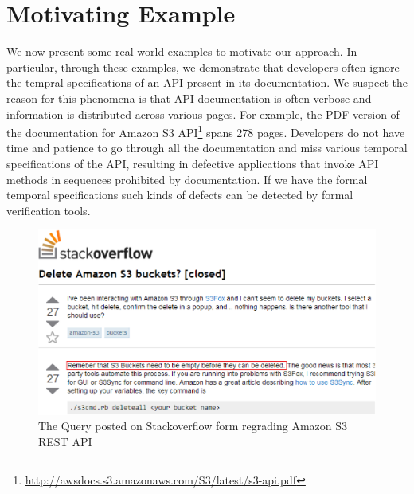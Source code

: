 \section{Motivating Example}
\label{sec:example}

We now present some real world examples to motivate our approach. In particular, through these examples, we demonstrate that developers often ignore the tempral specifications of an API present in its documentation. We suspect the reason for this phenomena is that API documentation is often verbose and information is distributed across various
pages. For example, the PDF version of the documentation for Amazon S3 API\footnote{\url{http://awsdocs.s3.amazonaws.com/S3/latest/s3-api.pdf}} spans 278 pages. Developers do not have time and patience to go through all the documentation and miss various temporal specifications of the API, resulting in defective applications that invoke API methods in sequences prohibited by documentation. 
If we have the formal temporal specifications such kinds of defects can be detected by formal verification tools.

\begin{figure}[t]
\begin{center}
\includegraphics[scale=0.45]{Stackoverflow.eps}
\end{center}
\caption{\label{fig:Stackoverflow} The Query posted on Stackoverflow form regrading Amazon S3 REST API}
\end{figure}

